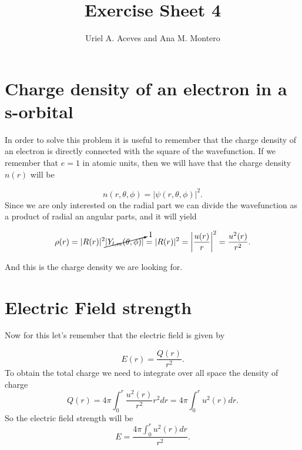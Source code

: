 \documentclass[12pt]{article}
\title{Exercise Sheet 4}
\author{Uriel A. Aceves and Ana M. Montero}
\begin{document}
\maketitle



\section{Charge density of an electron in a s-orbital}

In order to solve this problem it is useful to remember that the charge density of an electron is directly connected with the square of the wavefunction. If we remember that $e=1$ in atomic units, then we will have that the charge density $n(r)$ will be

\begin{equation}
    n(r,\theta,\phi) = |\psi(r,\theta,\phi)|^2.
\end{equation}
Since we are only interested on the radial part we can divide the wavefunction as a product of radial an angular parts, and it will yield

\begin{equation}
    \rho(r) = |R(r)|^2\cancelto{1}{|Y_{l,m}(\theta,\phi)|} = |R(r)|^2 = \left|\frac{u(r)}{r}\right|^2 = \frac{u^2(r)}{r^2}.
    \label{\rho}
\end{equation}

And this is the charge density we are looking for.
\section{Electric Field strength}

Now for this let's remember that the electric field is given by

\begin{equation}
    E(r) = \frac{Q(r)}{r^2}.
    \label{field}
\end{equation}
To obtain the total charge we need to integrate over all space the density of charge
\begin{equation}
    Q(r) = 4\pi \int_0^r \frac{u^2(r)}{r^2} r^2dr = 4\pi \int_0^r u^2(r) dr.
    \label{qtot}
\end{equation}
So the electric field strength will be 
\begin{equation}
    E = \frac{ 4\pi \int_0^r u^2(r) dr}{r^2}.
\end{equation}
\end{document}
